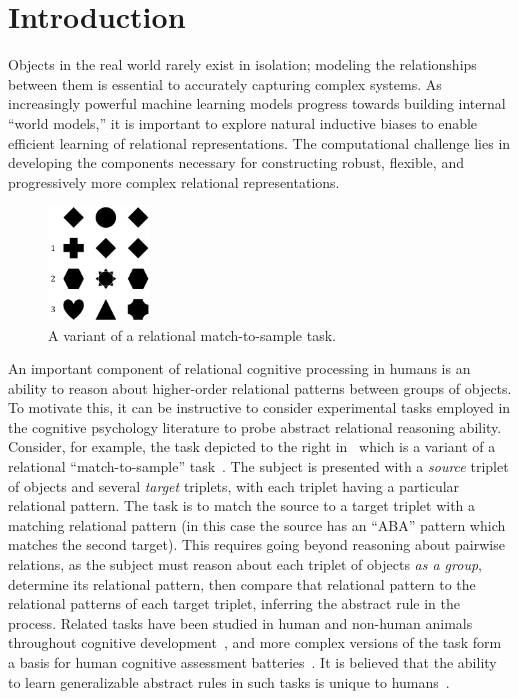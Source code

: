\section{Introduction}\label{sec:intro}

Objects in the real world rarely exist in isolation; 
modeling the relationships between them is essential to accurately capturing complex systems. As increasingly powerful machine learning models progress towards building internal ``world models,'' it is important to explore natural inductive biases to enable efficient learning of relational representations. The computational challenge lies in developing the components necessary for constructing robust, flexible, and progressively more complex relational representations.

\begin{figure}
    \vskip-10pt
    \includegraphics[width=0.24\textwidth]{figs/triplet_rmts_fig.pdf}
    \caption{A variant of a relational match-to-sample task.}\label{fig:rmts_example}
    \vskip-10pt
\end{figure}
An important component of relational cognitive processing in humans is an ability to reason about higher-order relational patterns between groups of objects. To motivate this, it can be instructive to consider experimental tasks employed in the cognitive psychology literature to probe abstract relational reasoning ability. Consider, for example, the task depicted to the right in~ which is a variant of a relational ``match-to-sample'' task~\citep{ferster1960intermittent, webbEmergentSymbols2021}. The subject is presented with a \textit{source} triplet of objects and several \textit{target} triplets, with each triplet having a particular relational pattern. The task is to match the source to a target triplet with a matching relational pattern (in this case the source has an ``ABA'' pattern which matches the second target).
This requires going beyond reasoning about pairwise relations, as the subject must reason about each triplet of objects \textit{as a group}, determine its relational pattern, then compare that relational pattern to the relational patterns of each target triplet, inferring the abstract rule in the process. Related tasks have been studied in human and non-human animals throughout cognitive development~\citep{carpenter1990one,marcus1999rule,Hochmann2017ChildrensRO}, and more complex versions of the task form a basis for human cognitive assessment batteries~\citep{englund1987unified}. It is believed that the ability to learn generalizable abstract rules in such tasks is unique to humans~\citep{fagot2001discriminating}.

